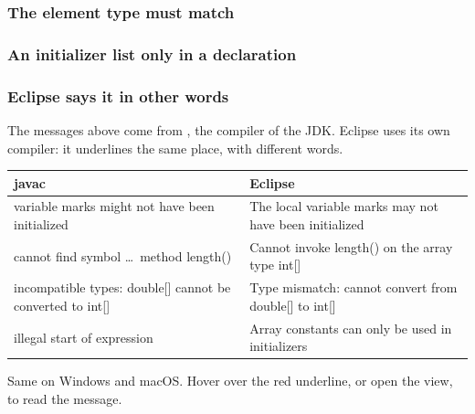 \documentclass[aspectratio=169,10pt,compress]{beamer}
\begin{document}
\begin{frame}[t,fragile] \frametitle{The element type must match}

	\small {}
\end{frame}




\begin{frame}[t,fragile] \frametitle{An initializer list only in a declaration}
\end{frame}




\begin{frame}[t,fragile] \frametitle{Eclipse says it in other words}
	The messages above come from , the compiler of the JDK.
	Eclipse uses its own compiler: it underlines the same place, with different words.


\begin{table}
		\footnotesize
		\begin{tabular}{@{}L{0.42\textwidth}L{0.50\textwidth}@{}}
			\toprule
			\textbf{javac} & \textbf{Eclipse}  \\
			\midrule
			variable marks might not have been initialized & The local variable marks may not have been initialized \\
			cannot find symbol \dots\ method length()        & Cannot invoke length() on the array type int[] \\
			incompatible types: double[] cannot be converted to int[] & Type mismatch: cannot convert from double[] to int[] \\
			illegal start of expression                    & Array constants can only be used in initializers \\
			\bottomrule
		\end{tabular}
\end{table}%


	\vspace{0.5em}
	\small Same on Windows and macOS. Hover over the red underline, or open the  view,
	to read the message.
\end{frame}
\end{document}
